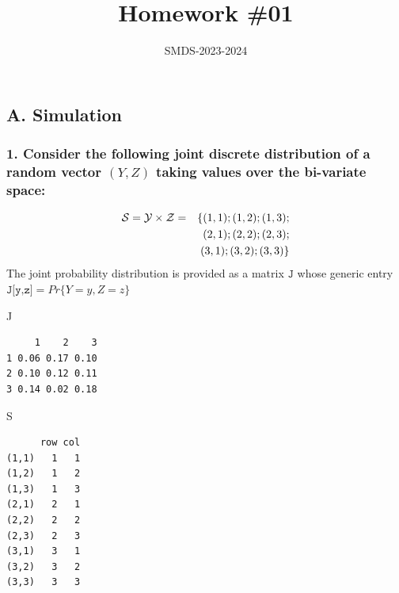 \documentclass[
]{article}
\title{Homework \#01}
\author{SMDS-2023-2024}
\date{\textsc{\textbf{\Large Statstical Methods in Data Science II a.y. 2022-2023}}\\
\strut \\
M.Sc. in Data Science\\
\strut \\
\underline{deadline: April 26th, 2024}}
\newenvironment{Shaded}{\begin{snugshade}}{\end{snugshade}}
\newcommand{\NormalTok}[1]{#1}
\begin{document}
\maketitle

\hypertarget{a.-simulation}{%
\subsection{A. Simulation}\label{a.-simulation}}

\hypertarget{consider-the-following-joint-discrete-distribution-of-a-random-vector-yz-taking-values-over-the-bi-variate-space}{%
\subsubsection{\texorpdfstring{1. Consider the following joint discrete
distribution of a random vector \((Y,Z)\) taking values over the
bi-variate
space:}{1. Consider the following joint discrete distribution of a random vector (Y,Z) taking values over the bi-variate space:}}\label{consider-the-following-joint-discrete-distribution-of-a-random-vector-yz-taking-values-over-the-bi-variate-space}}

\begin{eqnarray*}
{\cal S} = {\cal Y} \times {\cal Z} &=& \{(1,1);(1,2);(1,3);\\
&& (2,1);(2,2);(2,3);\\
&& (3,1);(3,2);(3,3)\}
\end{eqnarray*} The joint probability distribution is provided as a
matrix \(\texttt{J}\) whose generic entry
\(\texttt{J[y,z]}=Pr \{Y=y,Z=z\}\)

\begin{Shaded}
\begin{Highlighting}[]
\NormalTok{J}
\end{Highlighting}
\end{Shaded}

\begin{verbatim}
     1    2    3
1 0.06 0.17 0.10
2 0.10 0.12 0.11
3 0.14 0.02 0.18
\end{verbatim}

\begin{Shaded}
\begin{Highlighting}[]
\NormalTok{S}
\end{Highlighting}
\end{Shaded}

\begin{verbatim}
      row col
(1,1)   1   1
(1,2)   1   2
(1,3)   1   3
(2,1)   2   1
(2,2)   2   2
(2,3)   2   3
(3,1)   3   1
(3,2)   3   2
(3,3)   3   3
\end{verbatim}
\end{document}
